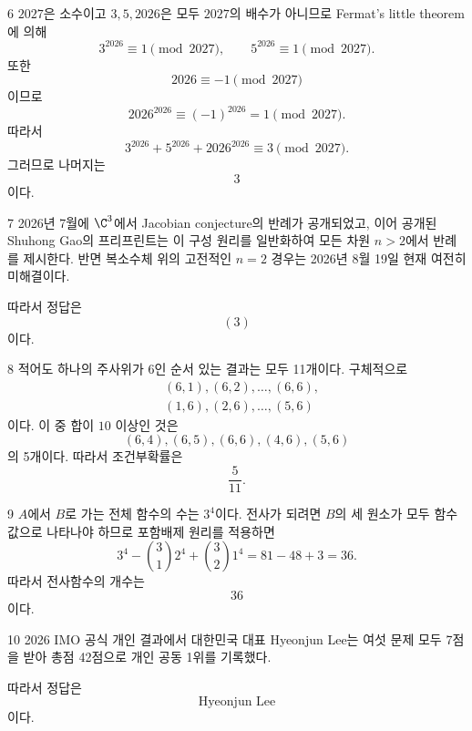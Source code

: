 \documentclass[11pt,oneside]{article}
\begin{document}
\begin{problemsolution}{6}
$2027$은 소수이고 $3,5,2026$은 모두 $2027$의 배수가 아니므로 Fermat's little theorem에 의해
\[
    3^{2026}\equiv1\pmod{2027},
    \qquad
    5^{2026}\equiv1\pmod{2027}.
\]
또한
\[
    2026\equiv-1\pmod{2027}
\]
이므로
\[
    2026^{2026}\equiv(-1)^{2026}=1\pmod{2027}.
\]
따라서
\[
    3^{2026}+5^{2026}+2026^{2026}
    \equiv3\pmod{2027}.
\]
그러므로 나머지는
\[
    \boxed{3}
\]
이다.
\end{problemsolution}

\begin{problemsolution}{7}
2026년 7월에 $\C^3$에서 Jacobian conjecture의 반례가 공개되었고, 이어 공개된 Shuhong Gao의 프리프린트는 이 구성 원리를 일반화하여 모든 차원 $n>2$에서 반례를 제시한다. 반면 복소수체 위의 고전적인 $n=2$ 경우는 2026년 8월 19일 현재 여전히 미해결이다.

따라서 정답은
\[
    \boxed{(3)}
\]
이다.
\end{problemsolution}

\begin{problemsolution}{8}
적어도 하나의 주사위가 $6$인 순서 있는 결과는 모두 11개이다. 구체적으로
\[
    \begin{aligned}
        &(6,1),(6,2),\ldots,(6,6),\\
        &(1,6),(2,6),\ldots,(5,6)
    \end{aligned}
\]
이다. 이 중 합이 $10$ 이상인 것은
\[
    (6,4),(6,5),(6,6),(4,6),(5,6)
\]
의 5개이다. 따라서 조건부확률은
\[
    \boxed{\frac5{11}}.
\]
\end{problemsolution}

\begin{problemsolution}{9}
$A$에서 $B$로 가는 전체 함수의 수는 $3^4$이다. 전사가 되려면 $B$의 세 원소가 모두 함수값으로 나타나야 하므로 포함배제 원리를 적용하면
\[
    3^4
    -\binom31 2^4
    +\binom32 1^4
    =81-48+3
    =36.
\]
따라서 전사함수의 개수는
\[
    \boxed{36}
\]
이다.
\end{problemsolution}

\begin{problemsolution}{10}
2026 IMO 공식 개인 결과에서 대한민국 대표 Hyeonjun Lee는 여섯 문제 모두 7점을 받아 총점 42점으로 개인 공동 1위를 기록했다.

따라서 정답은
\[
    \boxed{\text{Hyeonjun Lee}}
\]
이다.
\end{problemsolution}
\end{document}

